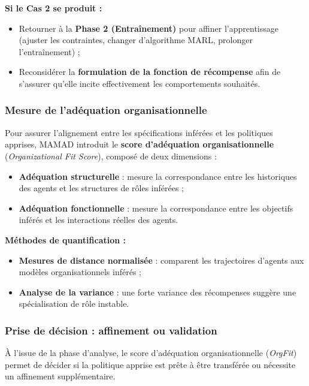 \documentclass[pdflatex,sn-mathphys-num]{sn-jnl}%
\theoremstyle{thmstyleone}%
\theoremstyle{thmstyletwo}%
\theoremstyle{thmstylethree}%
\begin{document}
\vspace{0.4em}
\noindent \textbf{Si le Cas 2 se produit :}
\begin{itemize}
    \item Retourner à la \textbf{Phase 2 (Entraînement)} pour affiner l'apprentissage (ajuster les contraintes, changer d'algorithme MARL, prolonger l'entraînement) ;
    \item Reconsidérer la \textbf{formulation de la fonction de récompense} afin de s'assurer qu'elle incite effectivement les comportements souhaités.
\end{itemize}

\subsubsection{Mesure de l'adéquation organisationnelle}

Pour assurer l'alignement entre les spécifications inférées et les politiques apprises, MAMAD introduit le \textbf{score d'adéquation organisationnelle} (\textit{Organizational Fit Score}), composé de deux dimensions :

\begin{itemize}
    \item \textbf{Adéquation structurelle} : mesure la correspondance entre les historiques des agents et les structures de rôles inférées ;
    \item \textbf{Adéquation fonctionnelle} : mesure la correspondance entre les objectifs inférés et les interactions réelles des agents.
\end{itemize}

\vspace{0.4em}
\noindent \textbf{Méthodes de quantification :}
\begin{itemize}
    \item \textbf{Mesures de distance normalisée} : comparent les trajectoires d'agents aux modèles organisationnels inférés ;
    \item \textbf{Analyse de la variance} : une forte variance des récompenses suggère une spécialisation de rôle instable.
\end{itemize}

\subsubsection{Prise de décision : affinement ou validation}

À l'issue de la phase d'analyse, le score d'adéquation organisationnelle (\textit{OrgFit}) permet de décider si la politique apprise est prête à être transférée ou nécessite un affinement supplémentaire.
\end{document}
